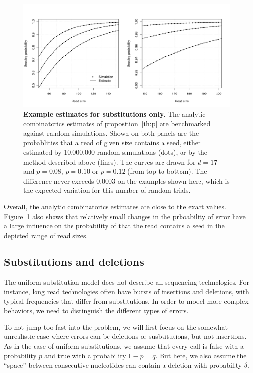\documentclass{article}
\begin{document}
\begin{figure}[h]
\centering
\includegraphics[scale=0.445]{simulp.pdf}
\caption{\textbf{Example estimates for substitutions only}. The analytic
combinatorics estimates of proposition~\ref{th:p} are benchmarked against
random simulations. Shown on both panels are the probablities that a read
of given size contains a seed, either estimated by 10,000,000 random
simulations (dots), or by the method described above (lines). The curves
are drawn for $d=17$ and $p=0.08$, $p=0.10$ or $p=0.12$ (from top to
bottom). The difference never exceeds 0.0003 on the examples shown here,
which is the expected variation for this number of random trials.}
\label{fig:simulp}
\end{figure}

Overall, the analytic combinatorics estimates are close to the exact
values. Figure~\ref{fig:simulp} also shows that relatively small changes
in the prboability of error have a large influence on the probability of
that the read contains a seed in the depicted range of read sizes.




\subsection{Substitutions and deletions}
\label{sec:deletions}

The uniform substitution model does not describe all sequencing
technologies. For instance, long read technologies often have bursts of
insertions and deletions, with typical frequencies that differ from
substitutions. In order to model more complex behaviors, we need to
distinguish the different types of errors.

To not jump too fast into the problem, we will first focus on the
somewhat unrealistic case where errors can be deletions or
susbtitutions, but not insertions. As in the case of uniform
substitutions, we assume that every call is false with a probability $p$
and true with a probability $1-p=q$. But here, we also assume the
``space''  between consecutive nucleotides can contain a deletion with
probability $\delta$.
\end{document}

